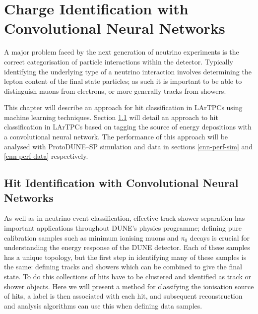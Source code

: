 \chapter{\label{ch:chargeid}Charge Identification with Convolutional Neural 
Networks} 

\minitoc

\noindent A major problem faced by the next generation of neutrino experiments
is the correct categorisation of particle interactions within the detector.
Typically identifying the underlying type of a neutrino interaction involves
determining the lepton content of the final state particles; as such it is
important to be able to distinguish muons from electrons, or more generally
tracks from showers.

This chapter will describe an approach for hit classification in LArTPCs using
machine learning techniques. Section \ref{hit-id} will detail an approach to 
hit classification in LArTPCs based on tagging the source of energy 
depositions with a convolutional neural network.  The performance of this 
approach will be analysed with ProtoDUNE--SP simulation and data in sections 
\ref{cnn-perf-sim} and \ref{cnn-perf-data} respectively.


\section{Hit Identification with Convolutional Neural Networks}
\label{hit-id}

As well as in neutrino event classification, effective track shower separation
has important applications throughout DUNE's physics programme; defining pure
calibration samples such as minimum ionising muons and \(\pi_0\) decays is
crucial for understanding the energy response of the DUNE detector. Each of
these samples has a unique topology, but the first step in identifying many of
these samples is the same: defining tracks and showers which can be combined to
give the final state. To do this collections of hits have to be clustered and
identified as track or shower objects. Here we will present a method for
classifying the ionisation source of hits, a label is then associated with each
hit, and subsequent reconstruction and analysis algorithms can use this when
defining data samples.

